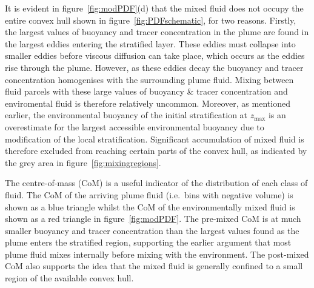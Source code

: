 \documentclass[a4paper]{article}
\begin{document}
It is evident in figure~\ref{fig:modPDF}(d) that the mixed fluid does not occupy the entire convex hull 
shown in figure~\ref{fig:PDFschematic}, for two reasons. Firstly, the largest values of buoyancy and
tracer concentration in the plume are found in the largest eddies entering the stratified layer. These eddies
must collapse into smaller eddies before viscous diffusion can take place, which occurs as the eddies rise
through the plume. However, as these eddies decay the buoyancy and tracer concentration homogenises with the
surrounding plume fluid. Mixing between fluid parcels with these large values of buoyancy \& tracer
concentration and enviromental fluid is therefore relatively uncommon. Moreover, as mentioned earlier,
the environmental buoyancy of the initial stratification at $z_{\max}$ is an overestimate for the largest
accessible environmental buoyancy due to modification of the local stratification. Significant accumulation of
mixed fluid is therefore excluded from reaching certain parts of the convex hull, as indicated by the grey
area in figure~\ref{fig:mixingregions}. 

The centre-of-mass (CoM) is a useful indicator of the distribution of each class of fluid. The CoM of the
arriving plume fluid (i.e.\ bins with negative volume) is shown as a blue triangle whilst the CoM of the
environmentally mixed fluid is shown as a red triangle in figure~\ref{fig:modPDF}. The pre-mixed CoM is at
much smaller buoyancy and tracer concentration than the largest values found as the plume enters the
stratified region, supporting the earlier argument that most plume fluid mixes internally before mixing with
the environment. The post-mixed CoM also supports the idea that the mixed fluid is generally confined to a
small region of the available convex hull.
\end{document}
